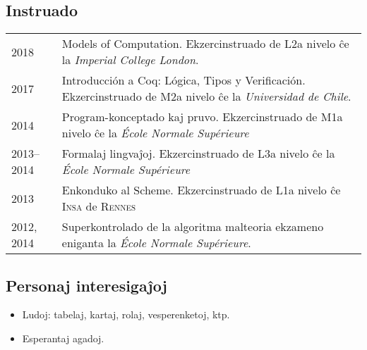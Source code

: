 \documentclass[12pt,a4paper]{article}
\makeatletter
\newcommand{\en}[1]{\foreignlanguage{english}{\textit{#1}}}
\newcommand{\fr}[1]{\foreignlanguage{french}{\textit{#1}}}
\newcommand{\es}[1]{\foreignlanguage{spanish}{\textit{#1}}}
\newenvironment{datecvsection}[1]%
               {\subsection*{#1}%
                 \noindent \begin{tabular}{@{}p{\annee}p{\texte}@{}}}
               {\end{tabular}}
\newenvironment{itemcvsection}[1]%
               {\subsection*{#1}\begin{itemize}}
               {\end{itemize}}
\makeatother
\begin{document}
\begin{datecvsection}{Instruado}

    2018 & Models of Computation. Ekzercinstruado de L2a nivelo ĉe la \en{Imperial College London}. \\

    2017 & Introducción a Coq: Lógica, Tipos y Verificación. Ekzercinstruado de M2a nivelo ĉe la \es{Universidad de Chile}. \\

    2014 & Program-konceptado kaj pruvo. Ekzercinstruado de M1a nivelo ĉe la \fr{École Normale Supérieure} \\

    2013–2014 & Formalaj lingvaĵoj. Ekzercinstruado de L3a nivelo ĉe la \fr{École Normale Supérieure} \\

    2013 & Enkonduko al Scheme. Ekzercinstruado de L1a nivelo ĉe \textsc{Insa} de \textsc{Rennes} \\

	2012, 2014 & Superkontrolado de la algoritma malteoria ekzameno eniganta la \fr{École Normale Supérieure}.

\end{datecvsection}

\begin{itemcvsection}{Personaj interesigaĵoj}

  \item Ludoj: tabelaj, kartaj, rolaj, vesperenketoj, ktp.
  \item Esperantaj agadoj.

\end{itemcvsection}
\end{document}
